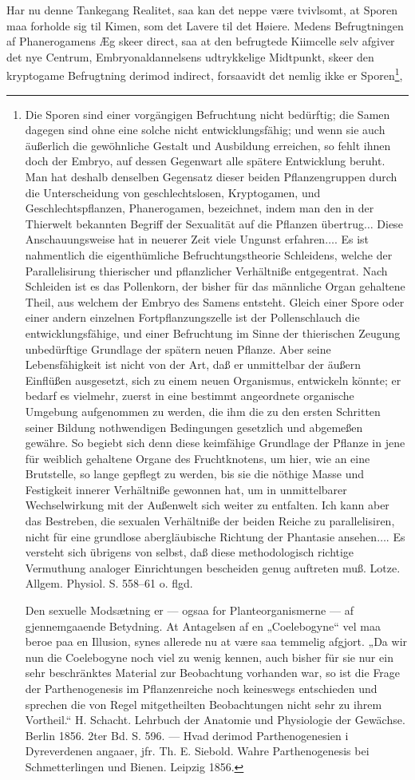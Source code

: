 \documentclass[12pt,a4paper]{book}
\begin{document}
Har nu denne Tankegang Realitet, saa kan det neppe være tvivlsomt, at
Sporen maa forholde sig til Kimen, som det Lavere til det Høiere. Medens
Befrugtningen af Phanerogamens Æg skeer direct, saa at den befrugtede
Kiimcelle selv afgiver det nye Centrum, Embryonaldannelsens udtrykkelige
Midtpunkt, skeer den kryptogame Befrugtning derimod indirect, forsaavidt
det nemlig ikke er Sporen\footnote{Die Sporen sind einer vorgängigen
Befruchtung nicht bedürftig; die Samen dagegen sind ohne eine solche
nicht entwicklungsfähig; und wenn sie auch äußerlich die gewöhnliche
Gestalt und Ausbildung erreichen, so fehlt ihnen doch der Embryo, auf
dessen Gegenwart alle spätere Entwicklung beruht. Man hat deshalb
denselben Gegensatz dieser beiden Pflanzengruppen durch die
Unterscheidung von geschlechtslosen, Kryptogamen, und
Geschlechtspflanzen, Phanerogamen, bezeichnet, indem man den in der
Thierwelt bekannten Begriff der Sexualität auf die Pflanzen
übertrug$\ldots$ Diese Anschauungsweise hat in neuerer Zeit viele
Ungunst erfahren$\ldots$. Es ist nahmentlich die eigenthümliche
Befruchtungstheorie Schleidens, welche der Parallelisirung thierischer
und pflanzlicher Verhältniße entgegentrat. Nach Schleiden ist es das
Pollenkorn, der bisher für das männliche Organ gehaltene Theil, aus
welchem der Embryo des Samens entsteht. Gleich einer Spore oder einer
andern einzelnen Fortpflanzungszelle ist der Pollenschlauch die
entwicklungsfähige, und einer Befruchtung im Sinne der thierischen
Zeugung unbedürftige Grundlage der spätern neuen Pflanze. Aber seine
Lebensfähigkeit ist nicht von der Art, daß er unmittelbar der äußern
Einflüßen ausgesetzt, sich zu einem neuen Organismus, entwickeln könnte;
er bedarf es vielmehr, zuerst in eine bestimmt angeordnete organische
Umgebung aufgenommen zu werden, die ihm die zu den ersten Schritten
seiner Bildung nothwendigen Bedingungen gesetzlich und abgemeßen
gewähre. So begiebt sich denn diese keimfähige Grundlage der Pflanze in
jene für weiblich gehaltene Organe des Fruchtknotens, um hier, wie an
eine Brutstelle, so lange gepflegt zu werden, bis sie die nöthige Masse
und Festigkeit innerer Verhältniße gewonnen hat, um in unmittelbarer
Wechselwirkung mit der Außenwelt sich weiter zu entfalten. Ich kann aber
das Bestreben, die sexualen Verhältniße der beiden Reiche zu
parallelisiren, nicht für eine grundlose abergläubische Richtung der
Phantasie ansehen$\ldots$. Es versteht sich übrigens von selbst, daß
diese methodologisch richtige Vermuthung analoger Einrichtungen
bescheiden genug auftreten muß. Lotze. Allgem. Physiol. S. 558--61
o. flgd.

Den sexuelle Modsætning er --- ogsaa for Planteorganismerne --- af
gjennemgaaende Betydning. At Antagelsen af en „Coelebogyne“ vel maa
beroe paa en Illusion, synes allerede nu at være saa temmelig afgjort.
„Da wir nun die Coelebogyne noch viel zu wenig kennen, auch bisher für
sie nur ein sehr beschränktes Material zur Beobachtung vorhanden war, so
ist die Frage der Parthenogenesis im Pflanzenreiche noch keineswegs
entschieden und sprechen die von Regel mitgetheilten Beobachtungen nicht
sehr zu ihrem Vortheil.“ H. Schacht. Lehrbuch der Anatomie und
Physiologie der Gewächse. Berlin 1856. 2ter Bd. S. 596. --- Hvad
derimod Parthenogenesien i Dyreverdenen angaaer, jfr. Th. E. Siebold.
Wahre Parthenogenesis bei Schmetterlingen und Bienen. Leipzig 1856.},
\end{document}
